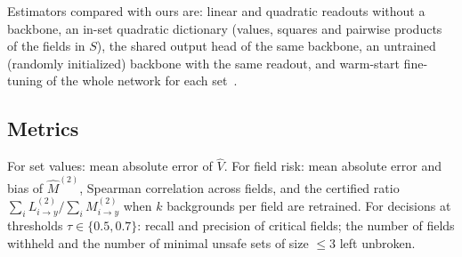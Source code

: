Estimators compared with ours are: linear and quadratic readouts without a backbone, an in-set
quadratic dictionary (values, squares and pairwise products of the fields in $S$), the shared
output head of the same backbone, an untrained (randomly initialized) backbone with the same
readout, and warm-start fine-tuning of the whole network for each set~\cite{sun2025warmstart}.

\subsection{Metrics}
For set values: mean absolute error of $\hat V$. For field risk: mean absolute error and bias of
$\hat M^{(2)}$, Spearman correlation across fields, and the certified ratio
$\sum_i L^{(2)}_{i\to y}/\sum_i M^{(2)}_{i\to y}$ when $k$ backgrounds per field are retrained.
For decisions at thresholds $\tau\in\{0.5,0.7\}$: recall and precision of critical fields; the
number of fields withheld and the number of minimal unsafe sets of size $\le 3$ left unbroken.
